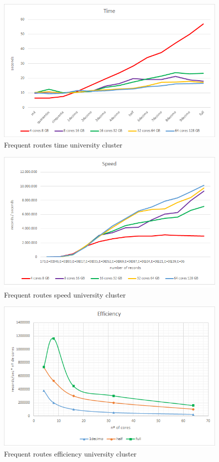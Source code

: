 \begin{figure}[htp!]
	\centering
	\caption{Frequent routes time university cluster}
	\label{tfu}
	\vspace{5pt}
	\includegraphics[scale=0.8]{geng/tfu}
\end{figure}
\begin{figure}[htp!]
	\centering
	\caption{Frequent routes speed university cluster}
	\label{sfu}
	\vspace{5pt}
	\includegraphics[scale=0.85]{geng/sfu}
\end{figure}
\begin{figure}[htp!]
	\centering
	\caption{Frequent routes efficiency university cluster}
	\label{efu}
	\vspace{5pt}
	\includegraphics[scale=0.85]{geng/efu}
\end{figure}

